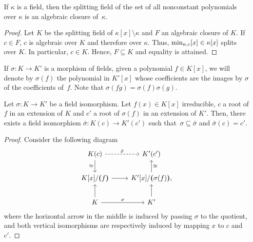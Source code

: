 \begin{cor}
    If\/ $\kappa$ is a field, then the splitting field of the set of all nonconstant polynomials over\/ $\kappa$ is an algebraic closure of\/~$\kappa$.
\end{cor}

\begin{proof}
     Let $K$ be the splitting field of $\kappa[x]\setminus\kappa$ and $F$ an algebraic closure of $K$. If $c\in F$, $c$ is algebraic over $K$ and therefore over $\kappa$. Thus, $\operatorname{min}_{\kappa,c}[x]\in\kappa[x]$ splits over $K$. In particular, $c\in K$. Hence, $F\subseteq K$ and equality is attained.
\end{proof}

\begin{ntn}
    If\/ $\sigma\colon K\to K'$ is a morphism of fields, given a polynomial\/ $f\in K[x]$, we will denote by\/ $\sigma(f)$ the polynomial in\/ $K'[x]$ whose coefficients are the images by\/ $\sigma$ of the coefficients of\/~$f$. Note that $\sigma(fg)=\sigma(f)\sigma(g)$.
\end{ntn}

\begin{lem}\label{lem:algebraic-extension-1}
    Let\/ $\sigma\colon K\to K'$ be a field isomorphism. Let\/ $f(x)\in K[x]$ irreducible, $c$ a root of\/ $f$ in an extension of\/ $K$ and\/ $c'$ a root of\/ $\sigma(f)$ in an extension of\/ $K'$. Then, there exists a field isomorphism\/ $\bar\sigma\colon K(c)\to K'(c')$ such that\/~$\sigma\subseteq\bar\sigma$ and $\bar\sigma(c)=c'$.
\end{lem}

\begin{proof}
    Consider the following diagram
    $$
        \begin{tikzcd}
            K(c)
                    \arrow[d,"\cong"']
                    \arrow[r,"\bar\sigma",dashed]
                &K'(c')\\
            {K[x]/\gen{\,f\,}}
                    \arrow[r]
                &{K'[x]/\gen{\,\sigma(f)\,},}
                    \arrow[u,"\cong"']\\
            K\arrow[u]
                    \arrow[r,"\sigma"]
                &K'
                    \arrow[u]                          
        \end{tikzcd}
    $$
    where the horizontal arrow in the middle is induced by passing $\sigma$ to the quotient, and both vertical isomorphisms are respectively induced by mapping $x$ to $c$ and~$c'$.
\end{proof}

